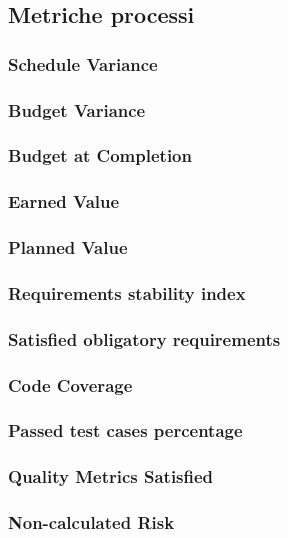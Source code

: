 \subsection{Metriche processi}
\subsubsection{Schedule Variance}
\subsubsection{Budget Variance}
\subsubsection{Budget at Completion}
\subsubsection{Earned Value}
\subsubsection{Planned Value}
\subsubsection{Requirements stability index}
\subsubsection{Satisﬁed obligatory requirements}
\subsubsection{Code Coverage}
\subsubsection{Passed test cases percentage}
\subsubsection{Quality Metrics Satisﬁed}
\subsubsection{Non-calculated Risk}